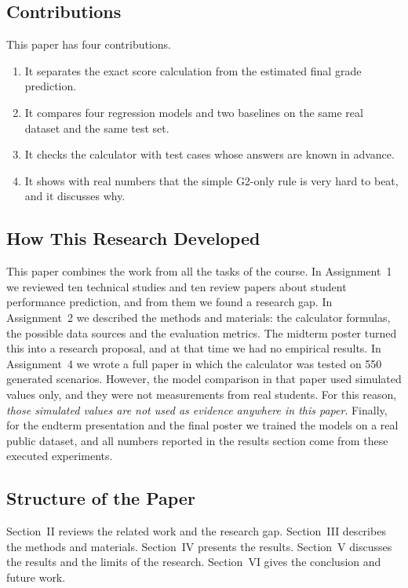 \documentclass[10pt,twocolumn,a4paper]{article}
\begin{document}
\subsection{Contributions}
This paper has four contributions.
\begin{enumerate}
  \item It separates the exact score calculation from the estimated final grade prediction.
  \item It compares four regression models and two baselines on the same real dataset and the same test set.
  \item It checks the calculator with test cases whose answers are known in advance.
  \item It shows with real numbers that the simple G2-only rule is very hard to beat, and it discusses why.
\end{enumerate}

\subsection{How This Research Developed}
This paper combines the work from all the tasks of the course. In Assignment~1 we reviewed ten technical studies and ten review papers about student performance prediction, and from them we found a research gap. In Assignment~2 we described the methods and materials: the calculator formulas, the possible data sources and the evaluation metrics. The midterm poster turned this into a research proposal, and at that time we had no empirical results. In Assignment~4 we wrote a full paper in which the calculator was tested on 550 generated scenarios. However, the model comparison in that paper used simulated values only, and they were not measurements from real students. For this reason, \emph{those simulated values are not used as evidence anywhere in this paper}. Finally, for the endterm presentation and the final poster we trained the models on a real public dataset, and all numbers reported in the results section come from these executed experiments.

\subsection{Structure of the Paper}
Section~II reviews the related work and the research gap. Section~III describes the methods and materials. Section~IV presents the results. Section~V discusses the results and the limits of the research. Section~VI gives the conclusion and future work.
\end{document}

